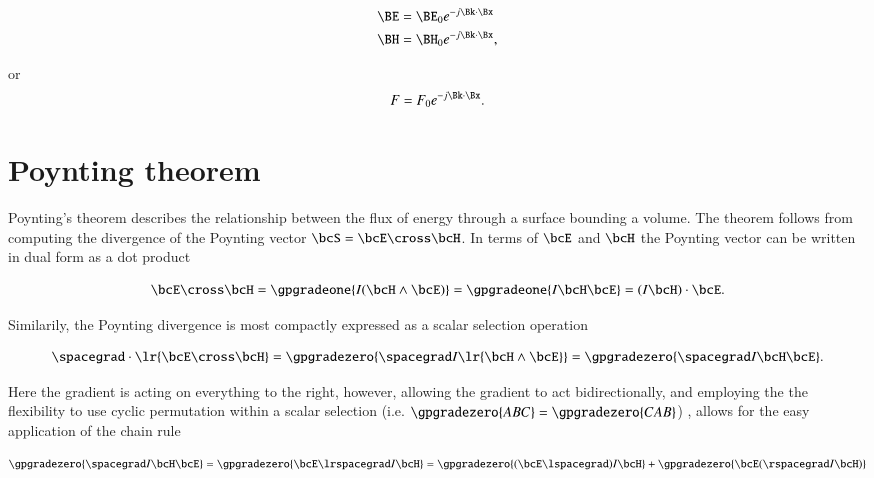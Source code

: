 \begin{dmath}\label{eqn:maxwellsEquations:580}
\begin{aligned}
\BE &= \BE_0 e^{-j \Bk \cdot \Bx} \\
\BH &= \BH_0 e^{-j \Bk \cdot \Bx},
\end{aligned}
\end{dmath}

or
\begin{dmath}\label{eqn:maxwellsEquations:600}
F = F_0 e^{-j \Bk \cdot \Bx}.
\end{dmath}



\section{Poynting theorem}

Poynting's theorem describes the relationship between the flux of energy through a surface bounding a volume.
The theorem follows from computing the divergence of the Poynting vector \( \bcS = \bcE \cross \bcH \).  In terms of \( \bcE \) and \( \bcH \) the Poynting vector can be written in dual form as a dot product

\begin{equation}\label{eqn:maxwellsEquations:780}
\bcE \cross \bcH
=
\gpgradeone{ I (\bcH \wedge \bcE) }
=
\gpgradeone{ I \bcH \bcE }
=
(I \bcH) \cdot \bcE.
\end{equation}

Similarily, the Poynting divergence is most compactly expressed as a scalar selection operation

\begin{equation}\label{eqn:maxwellsEquations:640}
\spacegrad \cdot \lr{ \bcE \cross \bcH }
=
\gpgradezero{ \spacegrad I \lr{ \bcH \wedge \bcE } }
=
\gpgradezero{ \spacegrad I \bcH \bcE }.
\end{equation}

Here the gradient is acting on everything to the right, however, allowing the gradient to act bidirectionally, and employing the
the flexibility to use cyclic permutation within a scalar selection
(i.e. \(\gpgradezero{ABC} = \gpgradezero{CAB}\))
, allows for the easy application of the chain rule

\begin{dmath}\label{eqn:maxwellsEquations:760}
\gpgradezero{ \spacegrad I \bcH \bcE }
=
\gpgradezero{ \bcE \lrspacegrad I \bcH }
=
\gpgradezero{ (\bcE \lspacegrad) I \bcH }
+\gpgradezero{ \bcE (\rspacegrad I \bcH) }
\end{dmath}

